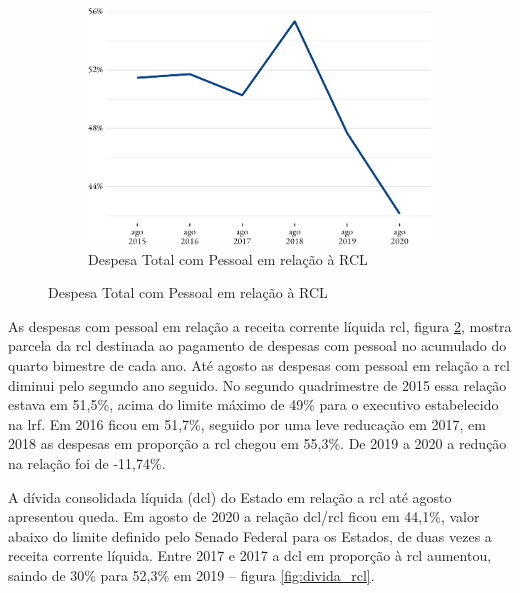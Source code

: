 \begin{figure}[!h]
	\begin{subfigure}{\linewidth}
		\caption{\label{fig:desp_pessoal_rcl}Despesa Total com Pessoal em relação à RCL}
		\includegraphics{fig/desp_pessoal_rcl-1.pdf}
	\end{subfigure}
\end{figure}

As despesas com pessoal em relação a receita corrente líquida
\acrshort{rcl}, figura \ref{fig:desp_pessoal_rcl}, mostra parcela da
\acrshort{rcl} destinada ao pagamento de despesas com pessoal no
acumulado do quarto bimestre de cada ano. Até agosto as despesas com
pessoal em relação a \acrshort{rcl} diminui pelo segundo ano seguido. No
segundo quadrimestre de 2015 essa relação estava em 51,5\%, acima do
limite máximo de 49\% para o executivo estabelecido na \acrshort{lrf}.
Em 2016 ficou em 51,7\%, seguido por uma leve reducação em 2017, em 2018
as despesas em proporção a \acrshort{rcl} chegou em 55,3\%. De 2019 a
2020 a redução na relação foi de -11,74\%.

A dívida consolidada líquida (\acrshort{dcl}) do Estado em relação a
\acrshort{rcl} até agosto apresentou queda. Em agosto de 2020 a relação
\acrshort{dcl}/\acrshort{rcl} ficou em 44,1\%, valor abaixo do limite
definido pelo Senado Federal para os Estados, de duas vezes a receita
corrente líquida. Entre 2017 e 2017 a \acrshort{dcl} em proporção à
\acrshort{rcl} aumentou, saindo de 30\% para 52,3\% em 2019 -- figura
\ref{fig:divida_rcl}.

